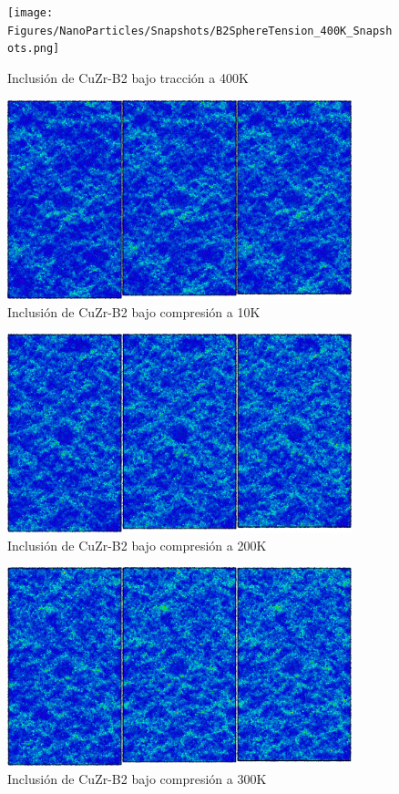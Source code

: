 \documentclass[10pt, oneside]{article} %
\begin{document}
\begin{figure}[H]
\centering
\texttt{[image: Figures/NanoParticles/Snapshots/B2SphereTension\_400K\_Snapshots.png]}
\caption{Inclusión de CuZr-B2 bajo tracción a 400K}
\end{figure}

\begin{figure}[H]
\centering
\includegraphics[width=10cm]{Figures/NanoParticles/Snapshots/B2SphereCompression_10K_Snapshots.png}
\caption{Inclusión de CuZr-B2 bajo compresión a 10K}
\end{figure}

\begin{figure}[H]
\centering
\includegraphics[width=10cm]{Figures/NanoParticles/Snapshots/B2SphereCompression_200K_Snapshots.png}
\caption{Inclusión de CuZr-B2 bajo compresión a 200K}
\end{figure}

\begin{figure}[H]
\centering
\includegraphics[width=10cm]{Figures/NanoParticles/Snapshots/B2SphereCompression_300K_Snapshots.png}
\caption{Inclusión de CuZr-B2 bajo compresión a 300K}
\end{figure}
\end{document}
